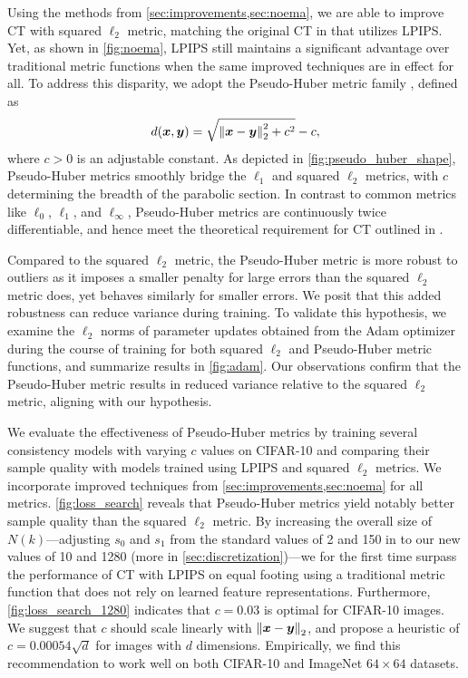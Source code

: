 Using the methods from \cref{sec:improvements,sec:noema}, we are able to improve CT with squared $\ell_2$ metric, matching the original CT in \citet{song2023consistency} that utilizes LPIPS. Yet, as shown in \cref{fig:noema}, LPIPS still maintains a significant advantage over traditional metric functions when the same improved techniques are in effect for all. To address this disparity, we adopt the Pseudo-Huber metric family \citep{charbonnier1997deterministic}, defined as
\begin{align}
d({\bm{x}}, {\bm{y}}) = \sqrt{\left\lVert{\bm{x}} - {\bm{y}}\right\rVert_2^2 + c^2} - c, \label{eq:pseudo_huber}
\end{align}
where $c > 0$ is an adjustable constant. As depicted in \cref{fig:pseudo_huber_shape}, Pseudo-Huber metrics smoothly bridge the $\ell_1$ and squared $\ell_2$ metrics, with $c$ determining the breadth of the parabolic section. In contrast to common metrics like $\ell_0$, $\ell_1$, and $\ell_\infty$, Pseudo-Huber metrics are continuously twice differentiable, and hence meet the theoretical requirement for CT outlined in \citet{song2023consistency}.


Compared to the squared $\ell_2$ metric, the Pseudo-Huber metric is more robust to outliers as it imposes a smaller penalty for large errors than the squared $\ell_2$ metric does, yet behaves similarly for smaller errors. We posit that this added robustness can reduce variance during training. To validate this hypothesis, we examine the $\ell_2$ norms of parameter updates obtained from the Adam optimizer during the course of training for both squared $\ell_2$ and Pseudo-Huber metric functions, and summarize results in \cref{fig:adam}. Our observations confirm that the Pseudo-Huber metric results in reduced variance relative to the squared $\ell_2$ metric, aligning with our hypothesis.

We evaluate the effectiveness of Pseudo-Huber metrics by training several consistency models with varying $c$ values on CIFAR-10 and comparing their sample quality with models trained using LPIPS and squared $\ell_2$ metrics. We incorporate improved techniques from \cref{sec:improvements,sec:noema} for all metrics. \cref{fig:loss_search} reveals that Pseudo-Huber metrics yield notably better sample quality than the squared $\ell_2$ metric. By increasing the overall size of $N(k)$---adjusting $s_0$ and $s_1$ from the standard values of 2 and 150 in \citet{song2023consistency} to our new values of 10 and 1280 (more in \cref{sec:discretization})---we for the first time surpass the performance of CT with LPIPS on equal footing using a traditional metric function that does not rely on learned feature representations. Furthermore, \cref{fig:loss_search_1280} indicates that $c=0.03$ is optimal for CIFAR-10 images. We suggest that $c$ should scale linearly with $\left\lVert{\bm{x}} - {\bm{y}}\right\rVert_2$, and propose a heuristic of $c = 0.00054 \sqrt{d}$ for images with $d$ dimensions. Empirically, we find this recommendation to work well on both CIFAR-10 and ImageNet $64\times 64$ datasets.


